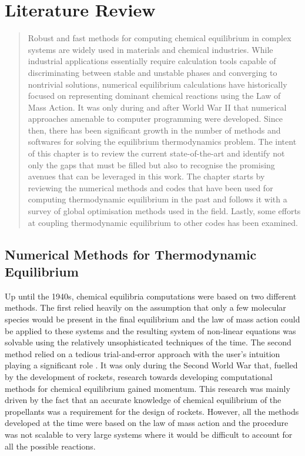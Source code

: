 \chapter{Literature Review} \label{chap:litreview}
\begin{abstract}
    Robust and fast methods for computing chemical equilibrium in complex systems are widely used in materials and chemical industries. While industrial applications essentially require calculation tools capable of discriminating between stable and unstable phases and converging to nontrivial solutions, numerical equilibrium calculations have historically focused on representing dominant chemical reactions using the Law of Mass Action. It was only during and after World War {II} that numerical approaches amenable to computer programming were developed. Since then, there has been significant growth in the number of methods and softwares for solving the equilibrium thermodynamics problem. The intent of this chapter is to review the current state-of-the-art and identify not only the gaps that must be filled but also to recognise the promising avenues that can be leveraged in this work. The chapter starts by reviewing the numerical methods and codes that have been used for computing thermodynamic equilibrium in the past and follows it with a survey of global optimisation methods used in the field. Lastly, some efforts at coupling thermodynamic equilibrium to other codes has been examined.
\end{abstract}
	
\section{Numerical Methods for Thermodynamic Equilibrium}
	Up until the 1940s, chemical equilibria computations were based on two different methods. The first relied heavily on the assumption that only a few molecular species would be present in the final equilibrium and the law of mass action could be applied to these systems and the resulting system of non-linear equations was solvable using the relatively unsophisticated techniques of the time. The second method relied on a tedious trial-and-error approach with the user's intuition playing a significant role \cite{vanZeggeren11}. It was only during the Second World War that, fuelled by the development of rockets, research towards developing computational methods for chemical equilibrium gained momentum. This research was mainly driven by the fact that an accurate knowledge of chemical equilibrium of the propellants was a requirement for the design of rockets. However, all the methods developed at the time were based on the law of mass action and the procedure was not scalable to very large systems where it would be difficult to account for all the possible reactions.

